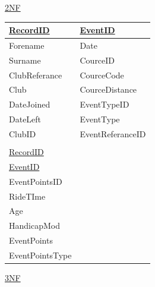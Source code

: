 \underline{2NF}

\begin{tabular}{|l|l|}
\hline
\underline{RecordID}  & \underline{EventID} \\ \hline
Forename             & Date                \\ \hline
Surname              & CourceID            \\ \hline
ClubReferance        & CourceCode          \\ \hline
Club                 & CourceDistance      \\ \hline
DateJoined           & EventTypeID         \\ \hline
DateLeft             & EventType           \\ \hline
ClubID               & EventReferanceID    \\ \hline
                     &                     \\ \hline
\underline{RecordID} &                     \\ \hline
\underline{EventID}  &                     \\ \hline 
EventPointsID        &                     \\ \hline
RideTIme             &                     \\ \hline
Age                  &                     \\ \hline
HandicapMod          &                     \\ \hline
EventPoints          &                     \\ \hline
EventPointsType      &                     \\ \hline
\end{tabular}

\underline{3NF}

